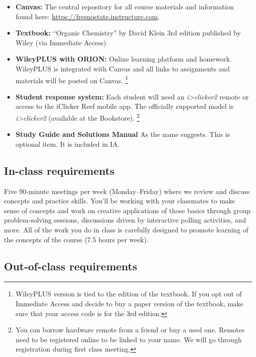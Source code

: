 \begin{itemize}
\tightlist
\item
  \textbf{Canvas:} The central repository for all course materials and
  information found here: \url{https://fresnostate.instructure.com}.
\item
  \textbf{Textbook:} ``Organic Chemistry'' by David Klein 3rd edition
  published by Wiley (via Immediate Access)
\item
  \textbf{WileyPLUS with ORION:} Online learning platform and homework.
  WileyPLUS is integrated with Canvas and all links to assignments and
  materials will be posted on Canvas. \footnote{WileyPLUS version is
    tied to the edition of the textbook. If you opt out of Immediate
    Access and decide to buy a paper version of the textbook, make sure
    that your access code is for the 3rd edition.}
\item
  \textbf{Student response system:} Each student will need an
  \emph{i\textgreater clicker2} remote or access to the iClicker Reef
  mobile app. The officially supported model is
  \emph{i\textgreater clicker2} (available at the Bookstore). \footnote{You
    can borrow hardware remote from a friend or buy a used one. Remotes
    need to be registered online to be linked to your name. We will go
    through registration during first class meeting.}
\item
  \textbf{Study Guide and Solutions Manual} As the name suggests. This
  is optional item. It is included in IA.
\end{itemize}

\hypertarget{in-class-requirements}{%
\subsection{In-class requirements}\label{in-class-requirements}}

Five 90-minute meetings per week (Monday--Friday) where we review and
discuss concepts and practice skills. You'll be working with your
classmates to make sense of concepts and work on creative applications
of those basics through group problem-solving sessions, discussions
driven by interactive polling activities, and more. All of the work you
do in class is carefully designed to promote learning of the concepts of
the course (7.5 hours per week).

\hypertarget{out-of-class-requirements}{%
\subsection{Out-of-class requirements}\label{out-of-class-requirements}}

